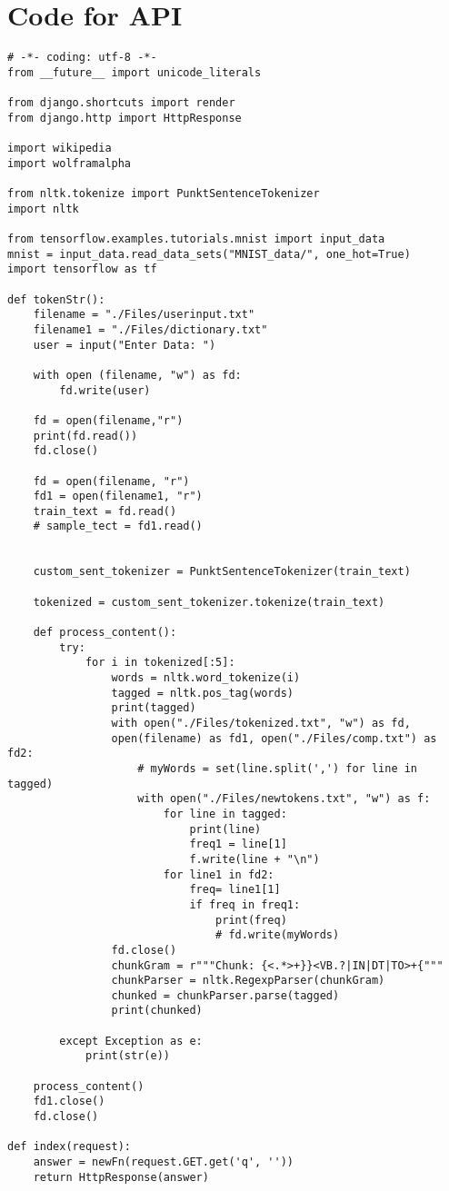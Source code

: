\section*{Code for API}

\begin{lstlisting}
# -*- coding: utf-8 -*-
from __future__ import unicode_literals

from django.shortcuts import render
from django.http import HttpResponse

import wikipedia
import wolframalpha

from nltk.tokenize import PunktSentenceTokenizer
import nltk

from tensorflow.examples.tutorials.mnist import input_data
mnist = input_data.read_data_sets("MNIST_data/", one_hot=True)
import tensorflow as tf

def tokenStr():
	filename = "./Files/userinput.txt"
	filename1 = "./Files/dictionary.txt"
	user = input("Enter Data: ")

	with open (filename, "w") as fd:
		fd.write(user)

	fd = open(filename,"r")
	print(fd.read())
	fd.close()

	fd = open(filename, "r")
	fd1 = open(filename1, "r")
	train_text = fd.read()
	# sample_tect = fd1.read()


	custom_sent_tokenizer = PunktSentenceTokenizer(train_text)

	tokenized = custom_sent_tokenizer.tokenize(train_text)

	def process_content():
		try:
			for i in tokenized[:5]:
				words = nltk.word_tokenize(i)
				tagged = nltk.pos_tag(words)
				print(tagged)
				with open("./Files/tokenized.txt", "w") as fd, 
				open(filename) as fd1, open("./Files/comp.txt") as fd2:
					# myWords = set(line.split(',') for line in tagged)
					with open("./Files/newtokens.txt", "w") as f:
						for line in tagged:
							print(line)
							freq1 = line[1]
							f.write(line + "\n")
						for line1 in fd2:
							freq= line1[1]
							if freq in freq1:
								print(freq)
								# fd.write(myWords)
				fd.close()
				chunkGram = r"""Chunk: {<.*>+}}<VB.?|IN|DT|TO>+{"""
				chunkParser = nltk.RegexpParser(chunkGram)
				chunked = chunkParser.parse(tagged)
				print(chunked)

		except Exception as e:
			print(str(e))
		
	process_content()
	fd1.close()
	fd.close()

def index(request):
	answer = newFn(request.GET.get('q', ''))
	return HttpResponse(answer)


\end{lstlisting}

